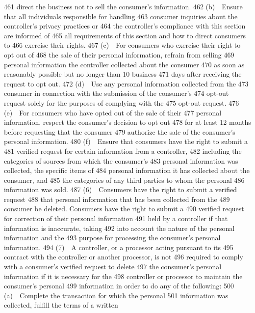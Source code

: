   461  direct the business not to sell the consumer’s information.
  462         (b) Ensure that all individuals responsible for handling
  463  consumer inquiries about the controller’s privacy practices or
  464  the controller’s compliance with this section are informed of
  465  all requirements of this section and how to direct consumers to
  466  exercise their rights.
  467         (c) For consumers who exercise their right to opt out of
  468  the sale of their personal information, refrain from selling
  469  personal information the controller collected about the consumer
  470  as soon as reasonably possible but no longer than 10 business
  471  days after receiving the request to opt out.
  472         (d) Use any personal information collected from the
  473  consumer in connection with the submission of the consumer’s
  474  opt-out request solely for the purposes of complying with the
  475  opt-out request.
  476         (e) For consumers who have opted out of the sale of their
  477  personal information, respect the consumer’s decision to opt out
  478  for at least 12 months before requesting that the consumer
  479  authorize the sale of the consumer’s personal information.
  480         (f) Ensure that consumers have the right to submit a
  481  verified request for certain information from a controller,
  482  including the categories of sources from which the consumer’s
  483  personal information was collected, the specific items of
  484  personal information it has collected about the consumer, and
  485  the categories of any third parties to whom the personal
  486  information was sold.
  487         (6) Consumers have the right to submit a verified request
  488  that personal information that has been collected from the
  489  consumer be deleted. Consumers have the right to submit a
  490  verified request for correction of their personal information
  491  held by a controller if that information is inaccurate, taking
  492  into account the nature of the personal information and the
  493  purpose for processing the consumer’s personal information.
  494         (7) A controller, or a processor acting pursuant to its
  495  contract with the controller or another processor, is not
  496  required to comply with a consumer’s verified request to delete
  497  the consumer’s personal information if it is necessary for the
  498  controller or processor to maintain the consumer’s personal
  499  information in order to do any of the following:
  500         (a) Complete the transaction for which the personal
  501  information was collected, fulfill the terms of a written
